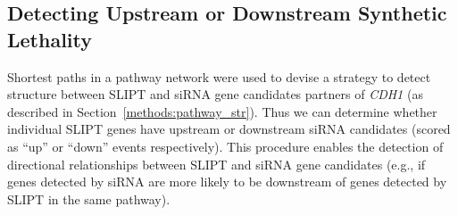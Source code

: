 
\FloatBarrier

\subsection{Detecting Upstream or Downstream Synthetic Lethality}  \label{chapt4:Structure_GPCR}

Shortest paths in a \gls{pathway} network were used to devise a strategy to detect  structure between \gls{SLIPT} and \gls{siRNA} gene candidates partners of \textit{CDH1} (as described in Section~\ref{methods:pathway_str}). Thus we can determine whether individual \gls{SLIPT} genes have upstream or downstream \gls{siRNA} candidates (scored as ``up'' or ``down'' events respectively). This procedure enables the detection of directional relationships between \gls{SLIPT} and \gls{siRNA} gene candidates (e.g., if genes detected by \gls{siRNA} are more likely to be downstream of genes detected by \gls{SLIPT} in the same pathway). %


